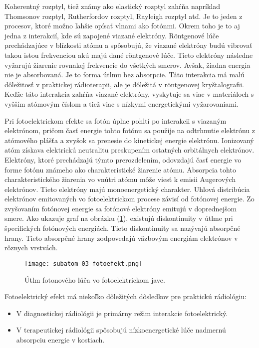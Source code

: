 \documentclass[../../main.tex]{subfiles}
\begin{document}
Koherentný rozptyl, tiež známy ako elastický rozptyl zahŕňa napríklad Thomsonov rozptyl, Rutherfordov rozptyl, Rayleigh rozptyl atď. Je to jeden z procesov, ktoré možno ľahšie opísať vlnami ako fotónmi. Okrem toho je to aj jedna z interakcií, kde sú zapojené viazané elektróny. Röntgenové lúče prechádzajúce v blízkosti atómu a spôsobujú, že viazané elektróny budú vibrovať takou istou frekvenciou akú majú dané röntgenové lúče. Tieto elektróny následne vyžarujú žiarenie rovnakej frekvencie do všetkých smerov.
Avšak, žiadna energia nie je absorbovaná. Je to forma útlmu bez absorpcie. Táto interakcia má malú dôležitosť v praktickej rádioterapii, ale je dôležitá v röntgenovej kryštalografii. Keďže táto interakcia zahŕňa viazané elektróny, vyskytuje sa viac v materiáloch s vyšším atómovým číslom a tiež viac s nízkymi energetickými vyžarovaniami.

Pri fotoelektrickom efekte sa fotón úplne pohltí po interakcii s viazaným elektrónom, pričom časť energie tohto fotónu sa použije na odtrhnutie elektrónu z atómového plášťa a zvyšok sa prenesie do kinetickej energie elektrónu. Ionizovaný atóm získava elektrickú neutralitu preskupením ostatných orbitálnych elektrónov. Elektróny, ktoré prechádzajú týmto prerozdelením, odovzdajú časť energie vo forme fotónu známeho ako charakteristické žiarenie atómu. Absorpcia tohto charakteristického žiarenia vo vnútri atómu môže viesť k emisii Augerových elektrónov. Tieto elektróny majú monoenergetický charakter. Uhlová distribúcia elektrónov emitovaných vo fotoelektrickom procese závisí od fotónovej energie. Zo zvyšovaním fotónovej energie sa fotónové elektróny emitujú v doprednejšom smere. Ako ukazuje graf na obrázku (\ref{sf3:fig:photo}), existujú diskontinuity v útlme pri špecifických fotónových energiách. Tieto diskontinuity sa nazývajú absorpčné hrany. Tieto absorpčné hrany zodpovedajú väzbovým energiám elektrónov v
rôznych vrstvách.

\begin{figure}[!h]
\texttt{[image: subatom-03-fotoefekt.png]}
\centering
\caption{Útlm fotonového lúča vo fotoelektrickom jave.}
\label{sf3:fig:photo}
\end{figure}

Fotoelektrický efekt má niekoľko dôležitých dôsledkov pre praktickú rádiológiu:
\begin{itemize}
\item V diagnostickej rádiológii je primárny režim interakcie fotoelektrický.
\item V terapeutickej rádiológii spôsobujú nízkoenergetické lúče nadmernú absorpciu energie v kostiach.
\end{itemize}
\end{document}
